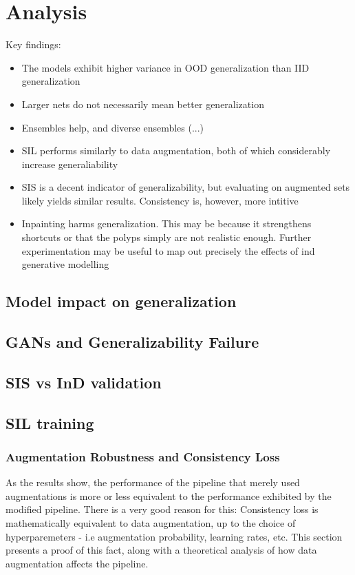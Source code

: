 \chapter{Analysis}\label{analysis}
Key findings:
\begin{itemize}
    \item The models exhibit higher variance in OOD generalization than IID generalization
    \item Larger nets do not necessarily mean better generalization
    \item Ensembles help, and diverse ensembles (...)
    \item SIL performs similarly to data augmentation, both of which considerably increase generaliability
    \item SIS is a decent indicator of generalizability, but evaluating on augmented sets likely yields similar results. Consistency is, however, more intitive
    \item Inpainting harms generalization. This may be because it strengthens shortcuts or that the polyps simply are not realistic enough. Further experimentation may be useful to map out precisely the effects of ind generative modelling 
\end{itemize}

\section{Model impact on generalization}
\section{GANs and Generalizability Failure}
\section{SIS vs InD validation}
\section{SIL training}
\subsection{Augmentation Robustness and Consistency Loss}
As the results show, the performance of the pipeline that merely used augmentations is more or less equivalent to the performance exhibited by the modified pipeline. There is a very good reason for this: Consistency loss is mathematically equivalent to data augmentation, up to the choice of hyperparemeters - i.e augmentation probability, learning rates, etc. This section presents a proof of this fact, along with a theoretical analysis of how data augmentation affects the pipeline. 
